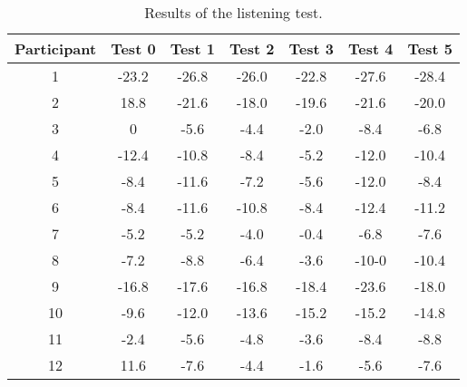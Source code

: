 \begin{table} [H]
	\centering
	\begin{tabular}{*{7}{c}}
		\hline
		Participant & Test 0 & Test 1 & Test 2 & Test 3  & Test 4  & Test 5  
		\\
		\hline
		1 & -23.2 & -26.8 & -26.0 &	-22.8 & -27.6 & -28.4 \\
		2 & 18.8 & -21.6 & -18.0 & -19.6  & -21.6  & -20.0 \\
		3 &0& -5.6 & -4.4 & -2.0 & -8.4 & -6.8  \\
		4 &-12.4& -10.8 & -8.4 & -5.2 & -12.0 & -10.4 \\
		5 &-8.4& -11.6 & -7.2 & -5.6	 & -12.0 & -8.4 \\
		6 &-8.4& -11.6 & -10.8 & -8.4 & -12.4 & -11.2 \\
		7 &-5.2& -5.2 & -4.0 & -0.4 & -6.8 & -7.6 \\
		8 &-7.2& -8.8 & -6.4 & -3.6 & -10-0 & -10.4 \\
		9 &-16.8& -17.6 & -16.8 & -18.4 & -23.6 & -18.0 \\
		10 &-9.6& -12.0 & -13.6 & -15.2 & -15.2 & 	-14.8 \\
		11 &-2.4& -5.6 & -4.8 & -3.6 & -8.4 & -8.8 \\
		12 &11.6& -7.6 & -4.4 & -1.6	 & -5.6 & 	-7.6   \\
		\hline
	\end{tabular}
	\caption{Results of the listening test. }
	\label{tab:ListeningResults}
\end{table}



